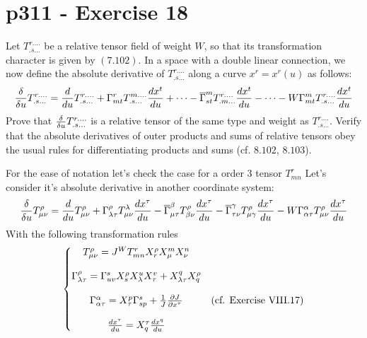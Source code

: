 \section{p311 - Exercise 18}
\begin{tcolorbox}
Let $T^{r . \dots}_{.s\dots}$ be a relative tensor field of weight $W$, so that its transformation character is given by $\mathbf{(7.102)}$. In a space with a double linear connection, we now define the absolute derivative of $T^{r . \dots}_{.s\dots}$ along a curve $x^r=x^r(u)$ as follows:
$$\fdv{}{u}T^{r . \dots}_{.s\dots} = \dv{}{u}T^{r . \dots}_{.s\dots}+\Gamma^r_{mt}T^{m . \dots}_{.s\dots}\dv{x^t}{u}+ \dots -\overline{\Gamma}^m_{st}T^{r . \dots}_{.m\dots}\dv{x^t}{u}-\dots -W\Gamma^m_{mt}T^{r . \dots}_{.s\dots}\dv{x^t}{u}$$
Prove that $\fdv{}{u}T^{r . \dots}_{.s\dots}$ is a relative tensor of the same type and weight as $T^{r . \dots}_{.s\dots}$. Verify that the absolute derivatives of outer products and sums of relative tensors obey the usual rules for differentiating products and sums (cf. $\mathbf{8.102}$, $\mathbf{8.103}$).
\end{tcolorbox}
For the ease of notation let's check the case for a order $3$ tensor $T^r_{mn}$
Let's consider it's absolute derivative in another coordinate system:
\begin{align}
\fdv{}{u}T^{\rho}_{\mu\nu} = \dv{}{u}T^{\rho}_{\mu\nu}+\Gamma^{\rho}_{\lambda\tau}T^{\lambda}_{\mu\nu}\dv{x^{\tau}}{u} -\overline{\Gamma}^{\beta}_{\mu\tau}T^{\rho}_{\beta\nu}\dv{x^{\tau}}{u}-\overline{\Gamma}^{\gamma}_{\tau\nu}T^{\rho}_{\mu\gamma}\dv{x^{\tau}}{u}-W\Gamma^{\alpha}_{\alpha\tau}T^{\rho}_{\mu\nu}\dv{x^{\tau}}{u}
\end{align}
With the following transformation rules
\begin{align}
\left\{\begin{matrix}
T^{\rho}_{\mu\nu} = J^W T^r_{mn} X^{\rho}_{r}X^{m}_{\mu}X^{n}_{\nu}&\\\\
\Gamma^{\rho}_{\lambda\tau} = \Gamma^{s}_{uv} X^{\rho}_{s}X^{u}_{\lambda}X^{v}_{\tau}+ X^q_{\lambda\tau}X^{\rho}_q&\\\\
\Gamma^{\alpha}_{\alpha\tau} = X^{p}_{\tau}\Gamma^s_{sp}+ \frac{1}{J}\pdv{J}{x^{\tau}}&\text{(cf. Exercise VIII.17)}\\\\
\dv{x^{\tau}}{u} = X^{\tau}_{q}\dv{x^q}{u}&\\
\end{matrix}\right.
\end{align}
